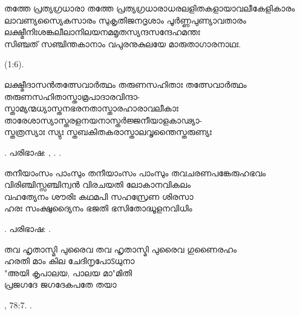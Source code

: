 \begin{enumerate}


\begin{slokam}{\VSr}{\Melp}{തത്തേ പ്രത്യഗ്രധാരാ}
തത്തേ പ്രത്യഗ്രധാരാധരലളിതകളായാവലീകേളികാരം\\
ലാവണ്യസ്യൈകസാരം സുകൃതിജനദൃശാം പൂർ‌ണ്ണപുണ്യാവതാരം\\
ലക്ഷ്മീനിഃശങ്കലീലാനിലയനമമൃതസ്യന്ദസന്ദേഹമന്തഃ\\
സിഞ്ചത് സഞ്ചിന്തകാനാം വപുരനുകുലയേ മാരുതാഗാരനാഥഃ.
\end{slokam}


 (1:6).



\begin{slokam}{\VMk}{ലക്ഷ്മീദാസൻ}{തത്സേവാർത്ഥം തരുണസഹിതാഃ}
തത്സേവാർത്ഥം തരുണസഹിതാസ്താമ്രപാദാരവിന്ദാ-\\
സ്താമ്യന്മധ്യാസ്തനഭരനതാസ്താരഹാരാവലീകാഃ\\
താരേശാസ്യാസ്തരളനയനാസ്തർജ്ജനീയാളകാഢ്യാ-\\
സ്തത്രസ്യാഃ സ്യുഃ സ്തബകിതകരാസ്താലവൃന്തൈസ്തരുണ്യഃ
\end{slokam}



.  പരിഭാഷ:  , .
.

\begin{slokam}{\VSk}{\Sank}{തനീയാംസം പാംസും}
തനീയാംസം പാംസും തവചരണപങ്കേരുഹഭവം\\
വിരിഞ്ചിസ്സഞ്ചിന്വൻ വിരചയതി ലോകാനവികലം\\
വഹത്യേനം ശൗരിഃ കഥമപി സഹസ്രേണ ശിരസാ\\
ഹരഃ സംക്ഷുദ്യൈനം ഭജതി ഭസിതോദ്ധൂളനവിധിം
\end{slokam}


.  പരിഭാഷ:  .

\begin{slokam}{\VVt}{\KD}{തവ ഹൃതാസ്മി പുരൈവ}
തവ ഹൃതാസ്മി പുരൈവ ഗുണൈരഹം\\
ഹരതി മാം കില ചേദിനൃപോऽധുനാ\\
"അയി കൃപാലയ, പാലയ മാ"മിതി\\
പ്രജഗദേ ജഗദേകപതേ തയാ 
\end{slokam}


, 78:7.
.
\end{enumerate}





